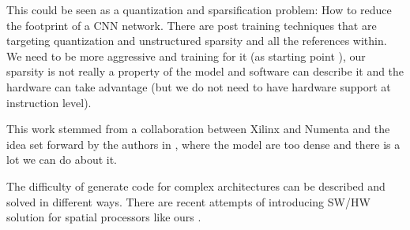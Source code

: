 \documentclass[sigconf]{acmart}
\begin{document}
This could be seen as a quantization and sparsification problem: How
to reduce the footprint of a CNN network. There are post training
techniques that are targeting quantization and unstructured sparsity
\cite{frantar2023gptq} and all the references within. We need to be
more aggressive and training for it (as starting point
\cite{abs-2102-11289}), our sparsity is not really a property of the
model and software can describe it and the hardware can take advantage
(but we do not need to have hardware support at instruction level).

This work stemmed from a collaboration between Xilinx and Numenta and
the idea set forward by the authors in \cite{ahmad2019dense}, where
the model are too dense and there is a lot we can do about
it. 


The difficulty of generate code for complex architectures can be
described and solved in different ways. There are recent attempts of
introducing SW/HW solution for spatial processors like ours
\cite{Huang2021CoSASB,Russo2023MemoryAwareDA,Cai2023InterlayerSS}. 
\end{document}
